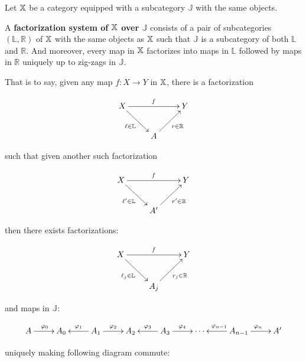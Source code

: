 \begingroup
\allowdisplaybreaks
\begin{definition}
Let $\mathbb{X}$ be a category equipped with a subcategory $\mathbb J$ with the same objects.

A {\bf factorization system of $\mathbb{X}$ over $\mathbb J$} consists of a pair of subcategories $(\mathbb L,\mathbb R)$ of $\mathbb{X}$ with the same objects as $\mathbb{X}$ such that $\mathbb J$ is a subcategory of both $\mathbb L$ and $\mathbb R$.  And moreover, every map in $\mathbb{X}$ factorizes into maps in $\mathbb L$ followed by maps in $\mathbb R$ uniquely up to zig-zags in $\mathbb J$.

That is to say, given any map $f:X\to Y$ in $\mathbb{X}$, there is a factorization

$$
\xymatrix{
X  \ar[rr]^{f} \ar[dr]_{\ell \in {\mathbb L}} &       & Y\\
   & A \ar[ur]_{r \in {\mathbb R}}
}
$$

such that given another such factorization

$$
\xymatrix{
X  \ar[rr]^{f} \ar[dr]_{\ell' \in {\mathbb L}} &       & Y\\
   & A' \ar[ur]_{r'  \in {\mathbb R}}
}
$$

%
%
%
then there exists factorizations:

$$
\xymatrix{
X  \ar[rr]^{f} \ar[dr]_{\ell_j\in {\mathbb L}} &       & Y\\
   & A_j \ar[ur]_{r_j \in {\mathbb R}}
}
$$


and  maps in $\mathbb J$:

$$
\xymatrix{
A \ar[r]^{\phi_0}
& A_0 
& A_1 \ar[l]_{\phi_1} \ar[r]^{\phi_2}
& A_2 
& A_3 \ar[l]_{\phi_3} \ar[r]^{\phi_4}
&\cdots
& A_{n-1} \ar[l]_{\phi_{n-1}} \ar[r]^{\phi_n}
& A'
}
$$


uniquely making following diagram commute:



\end{definition}
